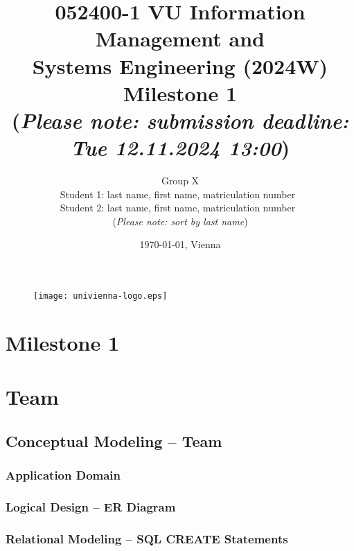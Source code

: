 \documentclass[a4paper, 11pt]{article}          %
\newcommand{\studentone}{Student 1: last name, first name, matriculation number}
\newcommand{\studenttwo}{Student 2: last name, first name, matriculation number}
\begin{document}
\begin{figure}                                  %
\flushleft
\texttt{[image: univienna-logo.eps]}
\end{figure}

\title{052400-1 VU Information Management and \\Systems Engineering (2024W)\\[1em] { Milestone 1\\[1em] 
\large(\textit{Please note: submission deadline: Tue 12.11.2024 13:00})}}
\author{
\Large{Group X}\\[1em]
\studentone\ \\[1em]
\studenttwo\ \\[1em]
\large(\textit{Please note: sort by last name})\\[1em]
}

\date{\today{}, Vienna}

\maketitle                                      %
\tableofcontents

\section{Milestone 1 }

\section*{Team}


\subsection{Conceptual Modeling -- Team}                           
\subsubsection{Application Domain}                             
\subsubsection{Logical Design -- ER Diagram}
\subsubsection{Relational Modeling -- SQL CREATE Statements}
\end{document}
